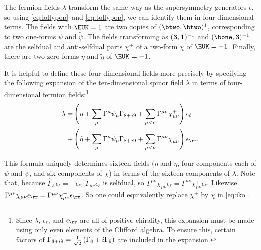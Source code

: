 \par{}

The fermion fields $\lambda$ transform the same way as the
supersymmetry generators $\epsilon$, so using \eqref{eq:lollypop}\ and
\eqref{eq:tollypop}, we can identify them in four-dimensional terms. The
fields with ${\EUK}=1$ are two copies of $(\btwo,\btwo)^1$,
corresponding to two one-forms $\psi$ and $\tilde\psi$. The fields
transforming as $({\bf 3},{\bf 1})^{-1}$ and $(\bone,{\bf
3})^{-1}$ are the selfdual and anti-selfdual parts $\chi^\pm$ of a
two-form $\chi$ of ${\EUK}=-1$. Finally, there are two zero-forms
$\eta$ and $\tilde\eta$ of ${\EUK}=-1$.

It is helpful to define these four-dimensional fields more
precisely by specifying the following expansion of the
ten-dimensional spinor field $\lambda$ in terms of
four-dimensional fermion fields:\footnote{Since $\lambda$,
$\epsilon_\ell$, and $\epsilon_\rr$ are all of positive chirality,
this expansion must be made using only even elements of the
Clifford algebra. To ensure this, certain factors of
$\Gamma_{8+i9}={1\over \sqrt 2}\left(\Gamma_8+ i \Gamma_9\right)$
are included in the expansion.}
\setcounter{equation}{17}
\begin{equation}\label{eq:iko}
\begin{aligned}\lambda=&\left(\eta
+\sum_\mu\Gamma^\mu\psi_\mu \Gamma_{8+i9}
+\sum_{\mu<\nu}\Gamma^{\mu\nu}\chi^+_{\mu\nu}\right)\epsilon_\ell
\\+& \left(\tilde\eta +\sum_{\mu}\Gamma^\mu\tilde\psi_\mu
\Gamma_{8+i9}+\sum_{
\mu<\nu}\Gamma^{\mu\nu}\chi^-_{\mu\nu}\right)\epsilon_\rr.\\\end{aligned}
\end{equation}

This formula uniquely determines sixteen fields ($\eta$ and
$\tilde\eta$, four components each of $\psi$ and $\tilde\psi$, and
six components of $\chi$) in terms of the sixteen components of
$\lambda$.  Note that, because
$\hat\Gamma_E\epsilon_\ell=-\epsilon_\ell$,
$\Gamma_{\mu\nu}\epsilon_\ell$ is selfdual, so
$\Gamma^{\mu\nu}\chi_{\mu\nu}\epsilon_\ell=\Gamma^{\mu\nu}\chi^+_{\mu\nu}\epsilon_\ell$.
Likewise
$\Gamma^{\mu\nu}\chi_{\mu\nu}\epsilon_\rr=\Gamma^{\mu\nu}\chi^-_{\mu\nu}\epsilon_\rr$.
So one could equivalently replace $\chi^\pm$ by $\chi$ in \eqref{eq:iko}.

